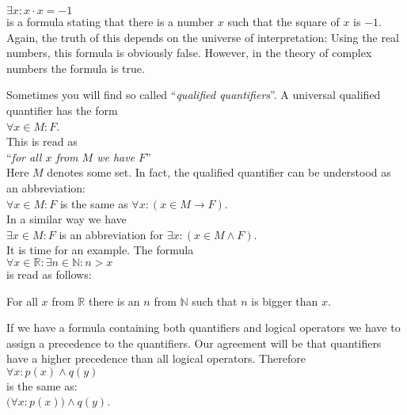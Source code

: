 \begin{enumerate}
\begin{enumerate}
            $\exists x: x \cdot x = -1$
            \\[0.2cm]
            is a formula stating that there is a number $x$ such that the square of $x$ 
            is $-1$.  Again, the truth of this depends on the 
            universe of interpretation:  Using the real numbers, this formula is obviously
            false.  However, in the theory of complex numbers the formula is true. 
      \end{enumerate}
      Sometimes you will find so called ``\emph{qualified quantifiers}''.  A universal
      qualified quantifier has the form
      \\[0.2cm]
      \hspace*{1.3cm} $\forall x \in M: F$. 
      \\[0.2cm]
      This is read as 
      \\[0.2cm]
      \hspace*{1.3cm}
      ``\emph{for all $x$ from $M$ we have $F$}''
      \\[0.2cm]
      Here $M$ denotes some set.  In fact, the qualified quantifier can be understood as an
      abbreviation: 
      \\[0.2cm]
      \hspace*{1.3cm} 
      $\forall x \in M: F$ \quad is the same as \quad
      $\forall x\colon (x\in M \rightarrow F)$.
      \\[0.2cm]
      In a similar way we have \\[0.2cm]
      \hspace*{1.3cm}  
      $\exists x \in M: F$ \quad is an abbreviation for \quad
      $\exists x\colon (x\in M \wedge F)$. 
      \\[0.2cm]
      It is time for an example.
      The formula \\[0.2cm]
      \hspace*{1.3cm} 
      $\forall x \in \mathbb{R}: \exists n \in \mathbb{N} : n > x$ 
      \\[0.2cm]
      is read as follows:
      \begin{center}
        {\em
        \begin{minipage}{12cm}
          For all  $x$ from $\mathbb{R}$ there is an $n$ from $\mathbb{N}$
          such that $n$ is bigger than $x$.
        \end{minipage}
        }
      \end{center}
      If we have a formula containing both quantifiers and logical operators we have to
      assign a precedence to the quantifiers.  
      Our agreement will be that quantifiers have a higher precedence than all logical
      operators.
      Therefore \\[0.2cm]
      \hspace*{1.3cm} $\forall x \colon p(x) \wedge q(y)$ \\[0.2cm]
      is the same as: \\[0.2cm]
      \hspace*{1.3cm} $\bigl(\forall x \colon p(x)\bigr) \wedge q(y)$. 
\end{enumerate}

